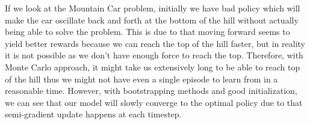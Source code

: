 \documentclass{exam}
\begin{document}
\begin{problem}
\begin{enumerate}
\begin{solutionorlines}[2in]
    If we look at the Mountain Car problem, initially we have bad policy which will make the car oscillate back and forth at the bottom of the hill without actually being able to solve the problem. This is due to that moving forward seems to yield better rewards because we can reach the top of the hill faster, but in reality it is not possible as we don't have enough force to reach the top. Therefore, with Monte Carlo approach, it might take us extensively long to be able to reach top of the hill thus we might not have even a single episode to learn from in a reasonable time. However, with bootstrapping methods and good initialization, we can see that our model will slowly converge to the optimal policy due to that semi-gradient update happens at each timestep.
    \end{solutionorlines}
\end{enumerate}
\end{problem}
\end{document}
